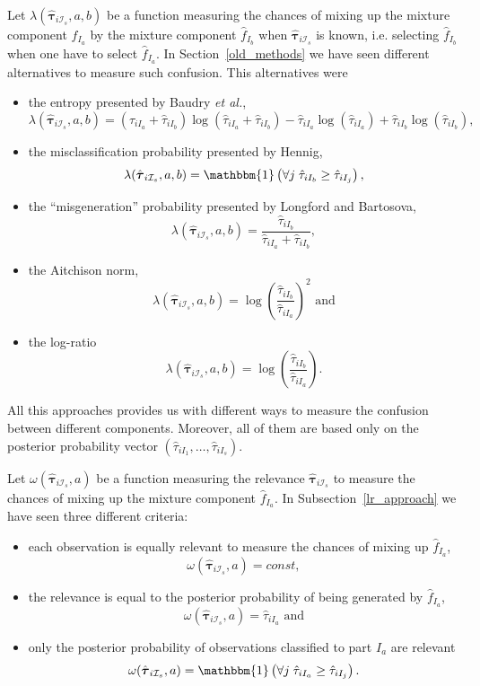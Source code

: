 \documentclass[10pt, a4paper]{article}
\newcommand{\m}[1]{\boldsymbol{#1}}
\begin{document}
Let $\lambda(\hat{\m \tau}_{i \mathcal{I}_s}, a, b)$ be a function measuring the chances of mixing up the mixture component $\hat{f}_{I_a}$ by the mixture component $\hat{f}_{I_b}$ when $\hat{\m \tau}_{i \mathcal{I}_s}$ is known, i.e. selecting $\hat{f}_{I_b}$ when one have to select $\hat{f}_{I_a}$. In Section~\ref{old_methods} we have seen different alternatives to measure such confusion. This alternatives were

\begin{itemize}
\item the entropy presented by Baudry \emph{et al.}, 
\[\lambda(\hat{\m \tau}_{i \mathcal{I}_s}, a, b) = (\hat{\tau}_{iI_a}+\hat{\tau}_{iI_b}) \log(\hat{\tau}_{iI_a} + \hat{\tau}_{iI_b}) - \hat{\tau}_{iI_a} \log(\hat{\tau}_{iI_a}) + \hat{\tau}_{iI_b} \log(\hat{\tau}_{iI_b}),\]
\item the misclassification probability presented by Hennig, \[\lambda(\hat{\m \tau}_{i \mathcal{I}_s}, a, b) = \mathbbm{1}\left( \forall j\; \hat{\tau}_{i I_{b}} \geq \hat{\tau}_{iI_j} \right),\]
\item the ``misgeneration'' probability presented by Longford and Bartosova, \[\lambda(\hat{\m \tau}_{i \mathcal{I}_s}, a, b) = \frac{\hat{\tau}_{iI_b}}{\hat{\tau}_{iI_a} + \hat{\tau}_{iI_b}},\]
\item the Aitchison norm, \[\lambda(\hat{\m \tau}_{i \mathcal{I}_s}, a, b) = \log (\frac{ \hat{\tau}_{iI_b} }{ \hat{\tau}_{iI_a} })^2 \text{ and}\]
\item the log-ratio \[ \lambda(\hat{\m \tau}_{i \mathcal{I}_s}, a, b) = \log (\frac{ \hat{\tau}_{iI_b} }{ \hat{\tau}_{iI_a} }).\]
\end{itemize}

All this approaches provides us with different ways to measure the confusion between different components. Moreover, all of them are based only on the posterior probability 
vector $(\hat{\tau}_{i I_{1}}, \dots, \hat{\tau}_{i I_{s}})$. 

Let $\omega(\hat{\m \tau}_{i \mathcal{I}_s}, a)$ be a function measuring the relevance $\hat{\m \tau}_{i \mathcal{I}_s}$ to measure the chances of mixing up  the mixture component $\hat{f}_{I_a}$. In Subsection~\ref{lr_approach} we have seen three different criteria:

\begin{itemize}
\item each observation is equally relevant to measure the chances of mixing up  $\hat{f}_{I_a}$, 
\[\omega(\hat{\m \tau}_{i \mathcal{I}_s}, a) = const,\]
\item the relevance is equal to the posterior probability of being generated by  $\hat{f}_{I_a}$, 
\[\omega(\hat{\m \tau}_{i \mathcal{I}_s}, a) =  \hat{\tau}_{iI_a} \text{ and}\]
\item  only the posterior probability of observations classified to part   $I_a$ are relevant
\[\omega(\hat{\m \tau}_{i \mathcal{I}_s}, a) = \mathbbm{1}\left( \forall j\; \hat{\tau}_{i I_{a}} \geq \hat{\tau}_{iI_j} \right).\]
\end{itemize}
\end{document}
